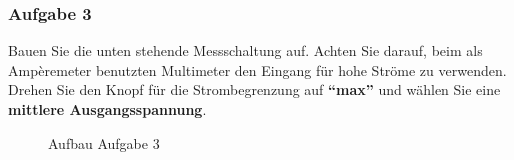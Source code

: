 \subsubsection{Aufgabe 3}
Bauen Sie die unten stehende Messschaltung auf. Achten Sie darauf, beim als Ampèremeter benutzten Multimeter den Eingang für hohe Ströme zu verwenden. Drehen Sie den Knopf für die Strombegrenzung auf \textbf{``max''} und wählen Sie eine \textbf{mittlere Ausgangsspannung}.
\begin{figure}[H]
\centering
{}
\caption{Aufbau Aufgabe 3}
\end{figure} 
